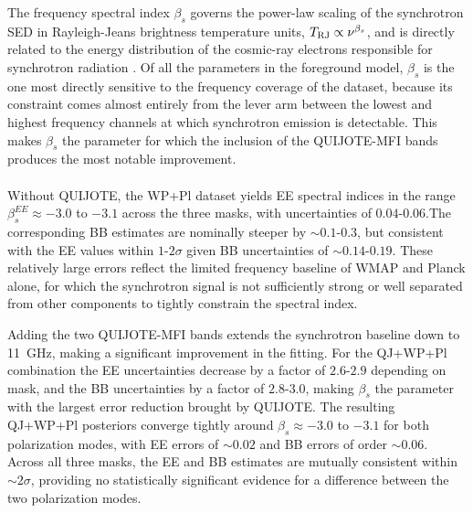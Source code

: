 The frequency spectral index $\beta_s$ governs the power-law scaling of the synchrotron SED in Rayleigh-Jeans brightness temperature units, $T_{\rm RJ} \propto \nu^{\beta_s}$, and is directly related to the energy distribution of the cosmic-ray electrons responsible for synchrotron radiation \citep{Rybicki_1979, Padovani_2021}. Of all the parameters in the foreground model, $\beta_s$ is the one most directly sensitive to the frequency coverage of the dataset, because its constraint comes almost entirely from the lever arm between the lowest and highest frequency channels at which synchrotron emission is detectable. This makes $\beta_s$ the parameter for which the inclusion of the QUIJOTE-MFI bands produces the most notable improvement.

\paragraph{}

Without QUIJOTE, the WP+Pl dataset yields EE spectral indices in the range $\beta_s^{EE} \approx -3.0$ to $-3.1$ across the three masks, with uncertainties of $0.04$-$0.06$.The corresponding BB estimates are nominally steeper by $\sim 0.1$-$0.3$, but consistent with the EE values within $1$-$2\sigma$ given BB uncertainties of $\sim 0.14$-$0.19$. These relatively large errors reflect the limited frequency baseline of WMAP and Planck alone, for which the synchrotron signal is not sufficiently strong or well separated from other components to tightly constrain the spectral index.

Adding the two QUIJOTE-MFI bands extends the synchrotron baseline down to 11~GHz, making a significant improvement in the fitting. For the QJ+WP+Pl combination the EE uncertainties decrease by a factor of $2.6$-$2.9$ depending on mask, and the BB uncertainties by a factor of $2.8$-$3.0$, making $\beta_s$ the parameter with the largest error reduction brought by QUIJOTE. The resulting QJ+WP+Pl posteriors converge tightly around $\beta_s \approx -3.0$ to $-3.1$ for both polarization modes, with EE errors of $\sim 0.02$ and BB errors of order $\sim0.06$. Across all three masks, the EE and BB estimates are mutually consistent within $\sim 2\sigma$, providing no statistically significant evidence for a difference between the two polarization modes.

\paragraph{}




